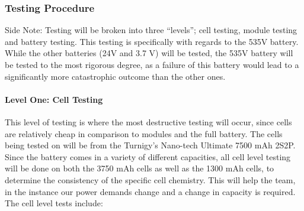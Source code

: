 \documentclass[main.tex]{subfiles}
\begin{document}
    \subsubsection{Testing Procedure}
    \label{subsubsec:testing-proc}
    Side Note: Testing will be broken into three “levels”; cell testing, module testing and battery testing. This testing is specifically with regards to the 535V battery. While the other batteries (24V and 3.7 V) will be tested, the 535V battery will be tested to the most rigorous degree, as a failure of this battery would lead to a significantly more catastrophic outcome than the other ones.

    \paragraph{Level One: Cell Testing}
    This level of testing is where the most destructive testing will occur, since cells are relatively cheap in comparison to modules and the full battery. The cells being tested on will be from the Turnigy’s Nano-tech Ultimate  7500 mAh 2S2P. Since the battery comes in a variety of different capacities, all cell level testing will be done on both the 3750 mAh cells as well as the 1300 mAh cells, to determine the consistency of the specific cell chemistry. This will help the team, in the instance our power demands change and a change in capacity is required. The cell level tests include:
\end{document}
